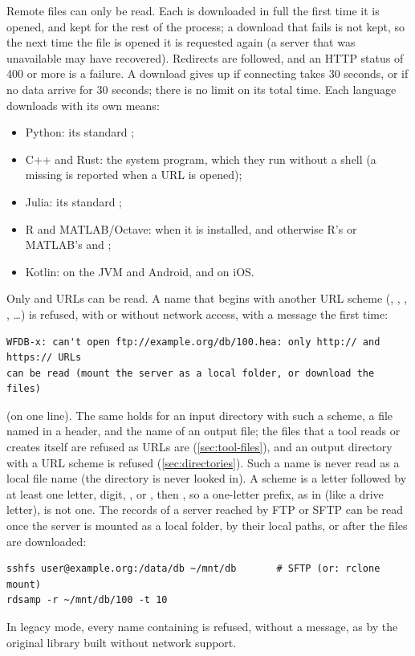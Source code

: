 Remote files can only be read. Each is downloaded in full the first time it
is opened, and kept for the rest of the process; a download that fails is
not kept, so the next time the file is opened it is requested again (a
server that was unavailable may have recovered). Redirects are followed, and
an HTTP status of 400 or more is a failure. A download gives up if
connecting takes 30 seconds, or if no data arrive for 30 seconds; there is
no limit on its total time. Each language downloads with its own means:
\begin{itemize}
\item Python: its standard ;
\item C++ and Rust: the system  program, which they run without a
  shell (a missing  is reported when a URL is opened);
\item Julia: its standard ;
\item R and MATLAB/Octave:  when it is installed, and otherwise
  R's  or MATLAB's  and ;
\item Kotlin:  on the JVM and Android, and
   on iOS.
\end{itemize}

Only  and  URLs can be read. A name that begins
with another URL scheme (, , ,
, \ldots) is refused, with or without network access, with a
message the first time:
\begin{lstlisting}[style=shell]
WFDB-x: can't open ftp://example.org/db/100.hea: only http:// and https:// URLs
can be read (mount the server as a local folder, or download the files)
\end{lstlisting}
(on one line). The same holds for an input directory with such a scheme,
a file named in a header, and the name of an output file; the files that a
tool reads or creates itself are refused as URLs are
(\cref{sec:tool-files}), and an output directory with a URL scheme is
refused (\cref{sec:directories}). Such a name is never read as a local file
name (the directory  is never looked in). A scheme is a letter
followed by at least one letter, digit, \code{+}, \code{-} or ,
then \code{://}, so a one-letter prefix, as in  (like a drive
letter), is not one. The records of a server reached by FTP or SFTP can be
read once the server is mounted as a local folder, by their local paths, or
after the files are downloaded:
\begin{lstlisting}[style=shell]
sshfs user@example.org:/data/db ~/mnt/db       # SFTP (or: rclone mount)
rdsamp -r ~/mnt/db/100 -t 10
\end{lstlisting}
In legacy mode, every name containing \code{://} is refused, without a
message, as by the original library built without network support.

